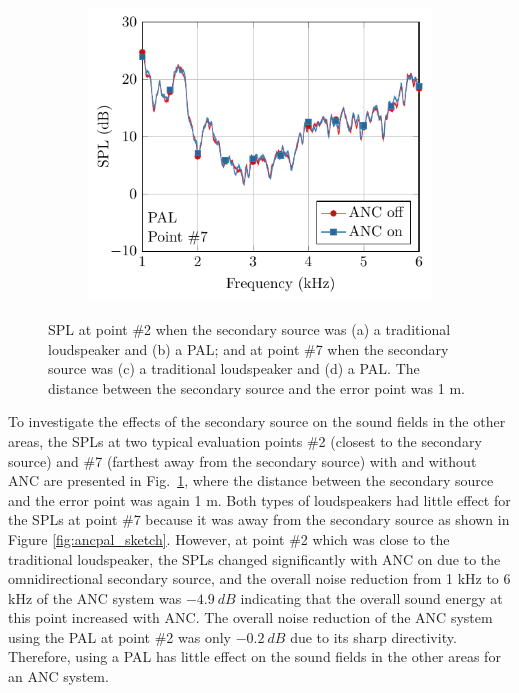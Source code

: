 \begin{figure}[!htb]
    \begin{subfigure}{0.4\textwidth}
        \centering
        \includegraphics[width = \textwidth]{fig/PAL_eval7_ANC_spectrum.pdf}
        \caption{}
    \end{subfigure}
    \caption{SPL  at point \#2 when the secondary source was (a) a traditional loudspeaker and (b) a PAL; and at point \#7 when the secondary source was (c) a traditional loudspeaker and (d) a PAL. The distance between the secondary source and the error point was 1 m.}
    \label{fig:ancpal_compare_point27}
\end{figure}

To investigate the effects of the secondary source on the sound fields in the other areas, the SPLs at two typical evaluation points \#2 (closest to the secondary source) and \#7 (farthest away from the secondary source) with and without ANC are presented in Fig.~\ref{fig:ancpal_compare_point27}, 
where the distance between the secondary source and the error point was again 1 m. 
Both types of loudspeakers had little effect for the SPLs at point \#7 because it was away from the secondary source as shown in Figure \ref{fig:ancpal_sketch}. 
However, at point \#2 which was close to the traditional loudspeaker, the SPLs changed significantly with ANC on due to the omnidirectional secondary source, and the overall noise reduction from 1 kHz to 6 kHz of the ANC system was $\SI{-4.9}{dB}$ indicating that the overall sound energy at this point increased with ANC. 
The overall noise reduction of the ANC system using the PAL at point \#2 was only $\SI{-0.2}{dB}$ due to its sharp directivity.
Therefore, using a PAL has little effect on the sound fields in the other areas for an ANC system. 



